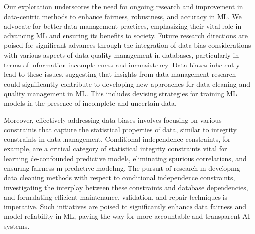 \documentclass[11pt]{article}
\begin{document}
Our exploration underscores the need for ongoing research and improvement in data-centric methods to enhance fairness, robustness, and accuracy in ML. We advocate for better data management practices, emphasizing their vital role in advancing ML and ensuring its benefits to society. Future research directions are poised for significant advances through the integration of data bias considerations with various aspects of data quality management in databases, particularly in terms of information incompleteness and inconsistency. Data biases inherently lead to these issues, suggesting that insights from data management research could significantly contribute to developing new approaches for data cleaning and quality management in ML. This includes devising strategies for training ML models in the presence of incomplete and uncertain data.

Moreover, effectively addressing data biases involves focusing on various constraints that capture the statistical properties of data, similar to integrity constraints in data management. Conditional independence constraints, for example, are a critical category of statistical integrity constraints vital for learning de-confounded predictive models, eliminating spurious correlations, and ensuring fairness in predictive modeling. The pursuit of research in developing data cleaning methods with respect to conditional independence constraints, investigating the interplay between these constraints and database dependencies, and formulating efficient maintenance, validation, and repair techniques is imperative. Such initiatives are poised to significantly enhance data fairness and model reliability in ML, paving the way for more accountable and transparent AI systems.


\begin{small}


\end{small}
\end{document}
